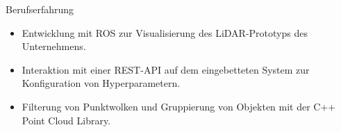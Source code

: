 \begin{rubric}{Berufserfahrung}
\vspace{\CVItemizeHeaderSpacing} \begin{itemize}[leftmargin=*, rightmargin=1cm]
	\setlength{\itemsep}{\CVItemizeSpacing}  
	\item Entwicklung mit ROS zur Visualisierung des LiDAR-Prototyps des Unternehmens.  
	\item Interaktion mit einer REST-API auf dem eingebetteten System zur Konfiguration von Hyperparametern.  
	\item Filterung von Punktwolken und Gruppierung von Objekten mit der C++ Point Cloud Library.  
\end{itemize}
%
%

\end{rubric}
